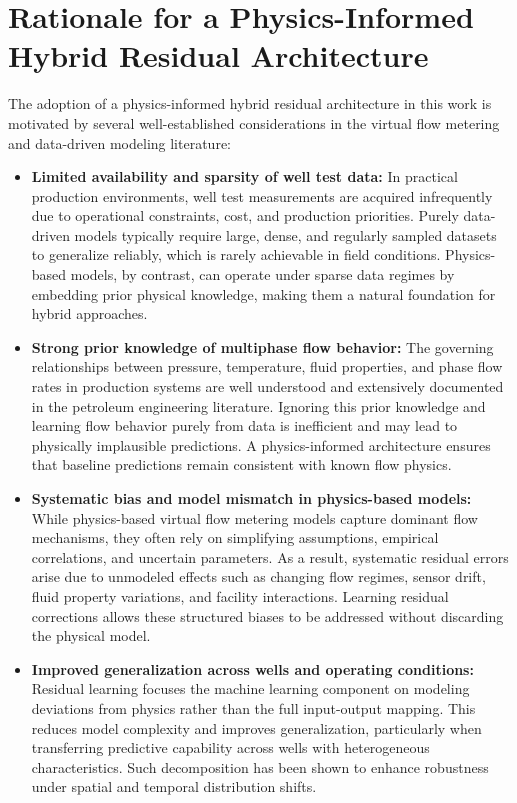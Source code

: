 \documentclass[12pt,APA]{uomthesis}
\begin{document}
\section{Rationale for a Physics-Informed Hybrid Residual Architecture}
The adoption of a physics-informed hybrid residual architecture in this work is motivated by several well-established considerations in the virtual flow metering and data-driven modeling literature:

\begin{itemize}
    \item \textbf{Limited availability and sparsity of well test data:}  
    In practical production environments, well test measurements are acquired infrequently due to operational constraints, cost, and production priorities. 
    Purely data-driven models typically require large, dense, and regularly sampled datasets to generalize reliably, which is rarely achievable in field conditions. 
    Physics-based models, by contrast, can operate under sparse data regimes by embedding prior physical knowledge, making them a natural foundation for hybrid approaches.

    \item \textbf{Strong prior knowledge of multiphase flow behavior:}  
    The governing relationships between pressure, temperature, fluid properties, and phase flow rates in production systems are well understood and extensively documented in the petroleum engineering literature. 
    Ignoring this prior knowledge and learning flow behavior purely from data is inefficient and may lead to physically implausible predictions. 
    A physics-informed architecture ensures that baseline predictions remain consistent with known flow physics.

    \item \textbf{Systematic bias and model mismatch in physics-based models:}  
    While physics-based virtual flow metering models capture dominant flow mechanisms, they often rely on simplifying assumptions, empirical correlations, and uncertain parameters. 
    As a result, systematic residual errors arise due to unmodeled effects such as changing flow regimes, sensor drift, fluid property variations, and facility interactions. 
    Learning residual corrections allows these structured biases to be addressed without discarding the physical model.

    \item \textbf{Improved generalization across wells and operating conditions:}  
    Residual learning focuses the machine learning component on modeling deviations from physics rather than the full input-output mapping. 
    This reduces model complexity and improves generalization, particularly when transferring predictive capability across wells with heterogeneous characteristics. 
    Such decomposition has been shown to enhance robustness under spatial and temporal distribution shifts.


\end{itemize}
\end{document}
